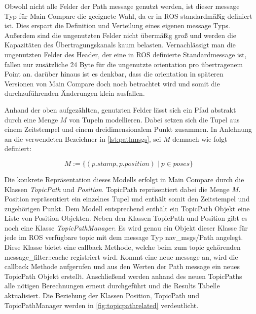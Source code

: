 Obwohl nicht alle Felder der Path message genutzt werden, ist dieser message Typ
für Main Compare die geeignete Wahl, da er in ROS standardmäßig
definiert ist. Dies erspart die Definition und Verteilung eines
eigenen message Typs. Außerdem sind die ungenutzten Felder nicht
übermäßig groß und werden die Kapazitäten des Übertragungskanals kaum belasten.
Vernachlässigt man die ungenutzten Felder des Header, der eine in ROS definierte Standardmessage ist, fallen nur
zusätzliche 24 Byte für die ungenutzte orientation pro übertragenem Point an.
darüber hinaus ist es denkbar, dass die orientation in späteren Versionen von
Main Compare doch noch betrachtet wird und somit die durchzuführenden
Änderungen klein ausfallen.

Anhand der oben aufgezählten, genutzten Felder lässt sich ein Pfad abstrakt durch eine Menge
$M$ von Tupeln modellieren. Dabei setzen sich die Tupel aus einem Zeitstempel und einem dreidimensionalem
Punkt zusammen. In Anlehnung an die verwendeten Bezeichner in
\autoref{lst:pathmsgs}, sei $M$ demnach wie folgt definiert:

\begin{equation*}
  \label{eqn:setdef}
  M := \{ (p.stamp , p.position) \mid p \in poses \}
\end{equation*}

Die konkrete Repräsentation dieses Modells erfolgt in Main Compare durch die
Klassen \textit{TopicPath} und \textit{Position}. TopicPath repräsentiert dabei
die Menge $M$. Position repräsentiert ein einzelnes Tupel und enthält somit den
Zeitstempel und zugehörigen Punkt. Dem Modell entsprechend enthält ein
TopicPath Objekt eine Liste von Position Objekten.  Neben den Klassen TopicPath
und Position gibt es noch eine Klasse \textit{TopicPathManager}. Es wird genau
ein Objekt dieser Klasse für jede im ROS verfügbare topic mit dem message Typ
nav\_msgs/Path angelegt. Diese
Klasse bietet eine callback Methode, welche beim zum topic gehörenden
message\_filter::cache registriert wird. Kommt eine neue message an, wird die
callback Methode aufgerufen und aus den Werten der Path message ein neues
TopicPath Objekt erstellt. Anschließend werden anhand des neuen TopicPaths
alle nötigen Berechnungen erneut durchgeführt und die Results Tabelle
aktualisiert. Die Beziehung der Klassen Position, TopicPath und
TopicPathManager werden in \autoref{fig:topicpathrelated} verdeutlicht.

